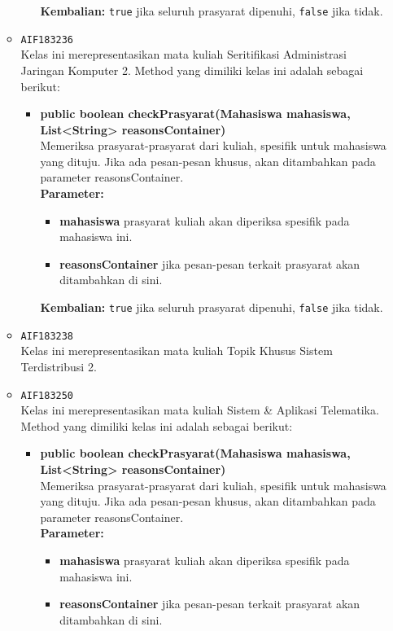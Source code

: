 \begin{enumerate}
\begin{itemize}
\begin{itemize}
\textbf{Kembalian:} \texttt{true} jika seluruh prasyarat dipenuhi, \texttt{false} jika tidak.
\end{itemize}
\item \texttt{AIF183236} \\
Kelas ini merepresentasikan mata kuliah Seritifikasi Administrasi Jaringan Komputer 2. Method yang dimiliki kelas ini adalah sebagai berikut: 
\begin{itemize}
\item \textbf{public boolean checkPrasyarat(Mahasiswa mahasiswa, List<String> reasonsContainer)}\\
Memeriksa prasyarat-prasyarat dari kuliah, spesifik untuk mahasiswa yang dituju. Jika ada pesan-pesan khusus, akan ditambahkan pada parameter reasonsContainer.\\
\textbf{Parameter:}
\begin{itemize}
\item \textbf{mahasiswa} prasyarat kuliah akan diperiksa spesifik pada mahasiswa ini.
\item \textbf{reasonsContainer} jika pesan-pesan terkait prasyarat akan ditambahkan di sini.
\end{itemize}
\textbf{Kembalian:} \texttt{true} jika seluruh prasyarat dipenuhi, \texttt{false} jika tidak.
\end{itemize}
\item \texttt{AIF183238} \\
Kelas ini merepresentasikan mata kuliah Topik Khusus Sistem Terdistribusi 2.
\item \texttt{AIF183250} \\
Kelas ini merepresentasikan mata kuliah Sistem \& Aplikasi Telematika. Method yang dimiliki kelas ini adalah sebagai berikut: 
\begin{itemize}
\item \textbf{public boolean checkPrasyarat(Mahasiswa mahasiswa, List<String> reasonsContainer)}\\
Memeriksa prasyarat-prasyarat dari kuliah, spesifik untuk mahasiswa yang dituju. Jika ada pesan-pesan khusus, akan ditambahkan pada parameter reasonsContainer.\\
\textbf{Parameter:}
\begin{itemize}
\item \textbf{mahasiswa} prasyarat kuliah akan diperiksa spesifik pada mahasiswa ini.
\item \textbf{reasonsContainer} jika pesan-pesan terkait prasyarat akan ditambahkan di sini.
\end{itemize}

\end{itemize}
\end{itemize}
\end{enumerate}
